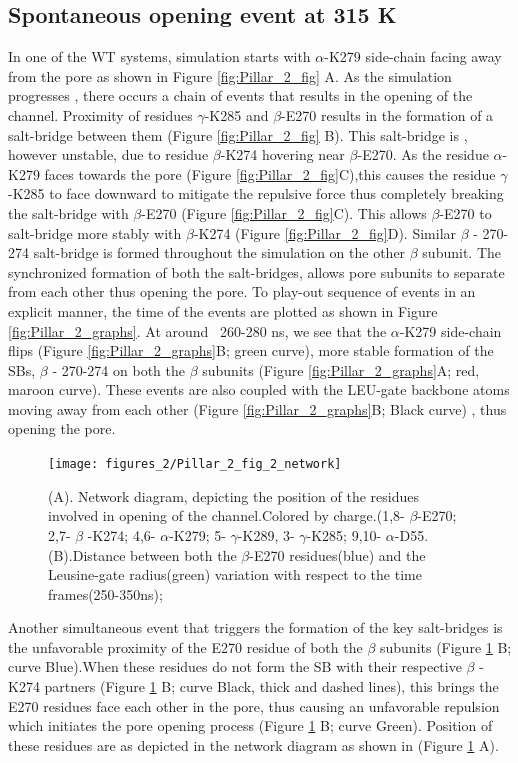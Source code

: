 \documentclass[9pt,twocolumn,twoside,lineno]{pnas-new}
\begin{document}
\subsection*{Spontaneous opening event at 315 K}
In one of the WT systems, simulation starts with $\alpha$-K279 side-chain facing away from the pore as shown in Figure \ref{fig:Pillar_2_fig} A. As the simulation progresses , there occurs a chain of events that results in the opening of the channel.  Proximity of residues $\gamma$-K285 and $\beta$-E270 results in the formation of a salt-bridge between them  (Figure \ref{fig:Pillar_2_fig} B). This salt-bridge is , however unstable, due to residue $\beta$-K274 hovering near $\beta$-E270. As the residue $\alpha$-K279 faces towards the pore (Figure \ref{fig:Pillar_2_fig}C),this causes the residue  $\gamma$-K285 to face downward to mitigate the repulsive force thus completely breaking the salt-bridge with  $\beta$-E270 (Figure \ref{fig:Pillar_2_fig}C). This allows $\beta$-E270 to salt-bridge more stably with $\beta$-K274 (Figure \ref{fig:Pillar_2_fig}D). Similar $\beta$ - 270-274 salt-bridge is formed throughout the simulation on the other $\beta$ subunit. The synchronized formation of both the salt-bridges, allows pore subunits to separate from each other thus opening the pore. To play-out sequence of events in an explicit manner, the time of the events are plotted as shown in Figure \ref{fig:Pillar_2_graphs}. At around ~260-280 ns, we see that the $\alpha$-K279 side-chain flips (Figure \ref{fig:Pillar_2_graphs}B; green curve), more stable formation of the SBs,  $\beta$ - 270-274 on both the $\beta$ subunits (Figure \ref{fig:Pillar_2_graphs}A; red, maroon curve). These events are also coupled with the LEU-gate backbone atoms moving away from each other (Figure \ref{fig:Pillar_2_graphs}B; Black curve) , thus opening the pore. 
\begin{figure}
\begin{center}
\texttt{[image: figures\_2/Pillar\_2\_fig\_2\_network]}
\end{center}
\caption{(A). Network diagram, depicting the position of the residues involved in opening of the channel.Colored by charge.(1,8- $\beta$-E270; 2,7- $\beta$ -K274; 4,6- $\alpha$-K279; 5- $\gamma$-K289, 3- $\gamma$-K285; 9,10- $\alpha$-D55. (B).Distance between both the $\beta$-E270 residues(blue) and the Leusine-gate radius(green) variation with respect to the time frames(250-350ns); }
\label{fig:Pillar_2_graphs_network}
\end{figure}
Another simultaneous event that triggers the formation of the key salt-bridges is the unfavorable proximity of the E270 residue of  both the $\beta$ subunits (Figure \ref{fig:Pillar_2_graphs_network} B; curve Blue).When these residues do not form the SB with their respective $\beta$ -K274 partners (Figure \ref{fig:Pillar_2_graphs_network} B; curve Black, thick and dashed lines), this brings the E270 residues face each other in the pore, thus causing an unfavorable repulsion which initiates the pore opening process (Figure \ref{fig:Pillar_2_graphs_network} B; curve Green). Position of these residues are as depicted in the network diagram as shown in (Figure \ref{fig:Pillar_2_graphs_network} A).
\end{document}
